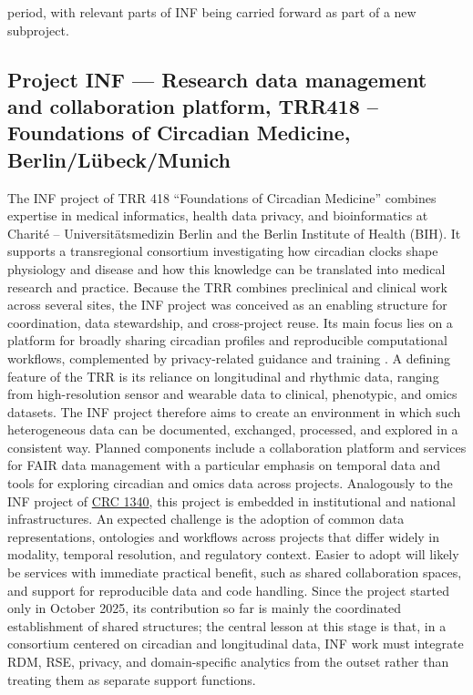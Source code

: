 \documentclass{eceasst}
\begin{document}
period, with relevant parts of INF being carried forward as part of a new subproject.

\subsection{Project INF --- Research data management and collaboration platform, TRR418 -- Foundations of Circadian Medicine, Berlin/Lübeck/Munich}
The INF project of TRR 418 “Foundations of Circadian Medicine” combines expertise in medical informatics, health data privacy, and bioinformatics at Charité – Universitätsmedizin Berlin and the Berlin Institute of Health (BIH). It supports a transregional consortium investigating how circadian clocks shape physiology and disease and how this knowledge can be translated into medical research and practice. Because the TRR combines preclinical and clinical work across several sites, the INF project was conceived as an enabling structure for coordination, data stewardship, and cross-project reuse. Its main focus lies on a platform for broadly sharing circadian profiles and reproducible computational workflows, complemented by privacy-related guidance and training \cite{baum_data_circadian_2023}. A defining feature of the TRR is its reliance on longitudinal and rhythmic data, ranging from high-resolution sensor and wearable data to clinical, phenotypic, and omics datasets. The INF project therefore aims to create an environment in which such heterogeneous data can be documented, exchanged, processed, and explored in a consistent way. Planned components include a collaboration platform and services for FAIR data management with a particular emphasis on temporal data and tools for exploring circadian and omics data across projects. Analogously to the INF project of \hyperref[sec:sfb1340]{CRC 1340}, this project is embedded in institutional and national infrastructures. An expected challenge is the adoption of common data representations, ontologies and workflows across projects that differ widely in modality, temporal resolution, and regulatory context. Easier to adopt will likely be services with immediate practical benefit, such as shared collaboration spaces, and support for reproducible data and code handling. Since the project started only in October 2025, its contribution so far is mainly the coordinated establishment of shared structures; the central lesson at this stage is that, in a consortium centered on circadian and longitudinal data, INF work must integrate RDM, RSE, privacy, and domain-specific analytics from the outset rather than treating them as separate support functions.
\end{document}
